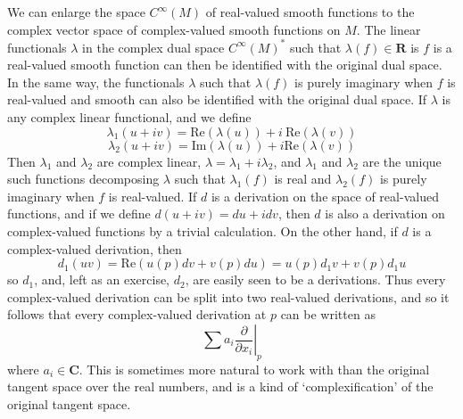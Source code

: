 \begin{remark}
    We can enlarge the space $C^\infty(M)$ of real-valued smooth functions to the complex vector space of complex-valued smooth functions on $M$. The linear functionals $\lambda$ in the complex dual space $C^\infty(M)^*$ such that $\lambda(f) \in \mathbf{R}$ is $f$ is a real-valued smooth function can then be identified with the original dual space. In the same way, the functionals $\lambda$ such that $\lambda(f)$ is purely imaginary when $f$ is real-valued and smooth can also be identified with the original dual space. If $\lambda$ is any complex linear functional, and we define
    \[ \lambda_1(u + iv) = \text{Re}(\lambda(u)) + i\ \text{Re}(\lambda(v)) \]
    \[ \lambda_2(u + iv) = \text{Im}(\lambda(u)) + i\text{Re}(\lambda(v)) \]
    Then $\lambda_1$ and $\lambda_2$ are complex linear, $\lambda = \lambda_1 + i\lambda_2$, and $\lambda_1$ and $\lambda_2$ are the unique such functions decomposing $\lambda$ such that $\lambda_1(f)$ is real and $\lambda_2(f)$ is purely imaginary when $f$ is real-valued. If $d$ is a derivation on the space of real-valued functions, and if we define $d(u + iv) = du + idv$, then $d$ is also a derivation on complex-valued functions by a trivial calculation. On the other hand, if $d$ is a complex-valued derivation, then
    \[ d_1(uv) = \text{Re}(u(p) dv + v(p) du) = u(p) d_1v + v(p) d_1u \]
    so $d_1$, and, left as an exercise, $d_2$, are easily seen to be a derivations. Thus every complex-valued derivation can be split into two real-valued derivations, and so it follows that every complex-valued derivation at $p$ can be written as
    \[ \sum a_i \left. \frac{\partial}{\partial x_i} \right|_p \]
    where $a_i \in \mathbf{C}$. This is sometimes more natural to work with than the original tangent space over the real numbers, and is a kind of `complexification' of the original tangent space.
\end{remark}

